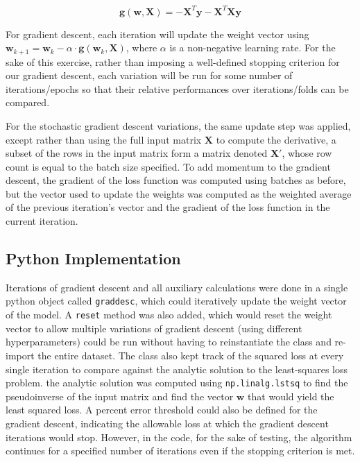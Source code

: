 \begin{equation}
\mathbf{g}(\mathbf{w}, \mathbf{X}) = -\mathbf{X}^T\mathbf{y} - \mathbf{X}^{T}\mathbf{X}\mathbf{y}
\end{equation}

For gradient descent, each iteration will update the weight vector using $\mathbf{w}_{k+1} = \mathbf{w}_{k} - \alpha \cdot \mathbf{g}(\mathbf{w}_{k}, \mathbf{X})$, where $\alpha$ is a non-negative learning rate. For the sake of this exercise, rather than imposing a well-defined stopping criterion for our gradient descent, each variation will be run for some number of iterations/epochs so that their relative performances over iterations/folds can be compared.

For the stochastic gradient descent variations, the same update step was applied, except rather than using the full input matrix $\mathbf{X}$ to compute the derivative, a subset of the rows in the input matrix form a matrix denoted $\mathbf{X'}$, whose row count is equal to the batch size specified. To add momentum to the gradient descent, the gradient of the loss function was computed using batches as before, but the vector used to update the weights was computed as the weighted average of the previous iteration's vector and the gradient of the loss function in the current iteration.

\subsection{Python Implementation}
Iterations of gradient descent and all auxiliary calculations were done in a single python object called \verb+graddesc+, which could iteratively update the weight vector of the model. A \verb+reset+ method was also added, which would reset the weight vector to allow multiple variations of gradient descent (using different hyperparameters) could be run without having to reinstantiate the class and re-import the entire dataset. The class also kept track of the squared loss at every single iteration to compare against the analytic solution to the least-squares loss problem. the analytic solution was computed using \verb+np.linalg.lstsq+ to find the pseudoinverse of the input matrix and find the vector $\mathbf{w}$ that would yield the least squared loss. A percent error threshold could also be defined for the gradient descent, indicating the allowable loss at which the gradient descent iterations would stop. However, in the code, for the sake of testing, the algorithm continues for a specified number of iterations even if the stopping criterion is met.


